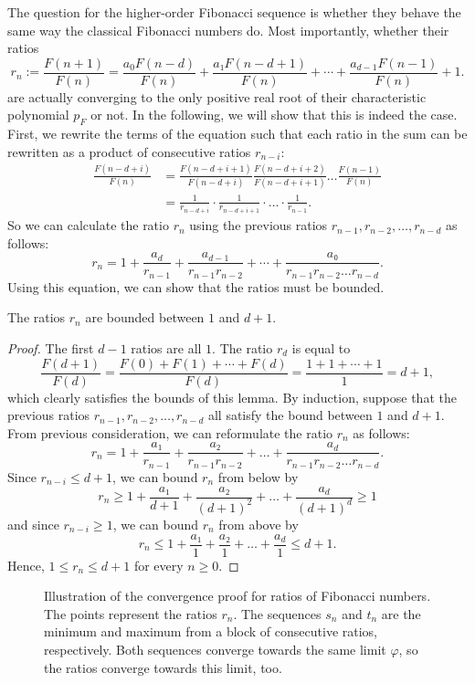 The question for the higher-order Fibonacci sequence is whether they behave the
same way the classical Fibonacci numbers do.
Most importantly, whether their ratios
\[
  r_n
  := \frac{F(n+1)}{F(n)}
  = \frac{a_0 F(n - d)}{F(n)} + \frac{a₁ F(n - d + 1)}{F(n)} + ⋯ + \frac{a_{d-1} F(n-1)}{F(n)} + 1.
\]
are actually converging to the only positive real root of their characteristic
polynomial $p_F$ or not.
In the following, we will show that this is indeed the case.
First, we rewrite the terms of the equation such that each ratio in the sum can
be rewritten as a product of consecutive ratios $r_{n-i}$:
\begin{align*}
  \frac{F(n - d + i)}{F(n)}
  & = \frac{F(n - d + i + 1)}{F(n - d + i)} \frac{F(n - d + i + 2)}{F(n - d + i + 1)} \dots \frac{F(n-1)}{F(n)} \\
  & = \frac{1}{r_{n - d + i}} · \frac{1}{r_{n - d + i + 1}} · \dots · \frac{1}{r_{n-1}}.
\end{align*}
So we can calculate the ratio $r_n$ using the previous ratios $r_{n-1}, r_{n-2}, …, r_{n-d}$ as follows:
\[
  r_n = 1 + \frac{a_d}{r_{n-1}} + \frac{a_{d-1}}{r_{n-1} r_{n-2}} + ⋯ + \frac{a₀}{r_{n-1} r_{n-2} \dots r_{n-d}}.
\]
Using this equation, we can show that the ratios must be bounded.

\begin{lemma}
  The ratios $r_n$ are bounded between $1$ and $d+1$.
\end{lemma}

\begin{proof}
  The first $d - 1$ ratios are all $1$.
  The ratio $r_d$ is equal to
  \[
    \frac{F(d+1)}{F(d)} = \frac{F(0) + F(1) + ⋯ + F(d)}{F(d)} = \frac{1 + 1 + ⋯ + 1}{1} = d + 1,
  \]
  which clearly satisfies the bounds of this lemma.
  By induction, suppose that the previous ratios $r_{n-1}, r_{n-2}, …, r_{n-d}$
  all satisfy the bound between $1$ and $d+1$.
  From previous consideration, we can reformulate the ratio $r_n$ as follows:
  \[
    r_n = 1 + \frac{a₁}{r_{n-1}} + \frac{a₂}{r_{n-1} r_{n-2}} + \dots + \frac{a_d}{r_{n-1} r_{n-2} \dots r_{n-d}}.
  \]
  Since $r_{n-i} ≤ d+1$, we can bound $r_n$ from below by
  \[
    r_n ≥ 1 + \frac{a₁}{d+1} + \frac{a₂}{(d+1)^2} + \dots + \frac{a_d}{(d+1)^d} ≥ 1
  \]
  and since $r_{n-i} ≥ 1$, we can bound $r_n$ from above by
  \[
    r_n ≤ 1 + \frac{a₁}{1} + \frac{a₂}{1} + \dots + \frac{a_d}{1} ≤ d+1.
  \]
  Hence, $1 ≤ r_n ≤ d+1$ for every $n ≥ 0$.
\end{proof}

\begin{figure}[tbp]
  \centering
  
  \caption{
    Illustration of the convergence proof for ratios of Fibonacci numbers.
    The points represent the ratios $r_n$.
    The sequences $s_n$ and $t_n$ are the minimum and maximum from a block of
    consecutive ratios, respectively.
    Both sequences converge towards the same limit $φ$, so the ratios converge
    towards this limit, too.
  }
  \label{fig:fibonacci-convergence}
\end{figure}


